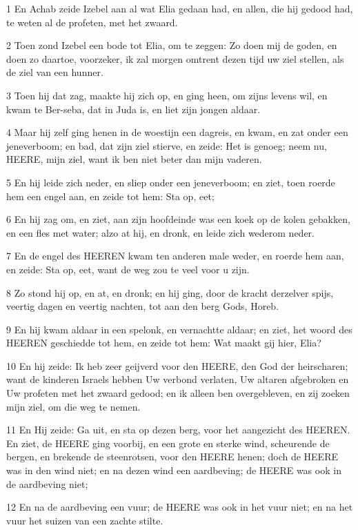 \par 1 En Achab zeide Izebel aan al wat Elia gedaan had, en allen, die hij gedood had, te weten al de profeten, met het zwaard.
\par 2 Toen zond Izebel een bode tot Elia, om te zeggen: Zo doen mij de goden, en doen zo daartoe, voorzeker, ik zal morgen omtrent dezen tijd uw ziel stellen, als de ziel van een hunner.
\par 3 Toen hij dat zag, maakte hij zich op, en ging heen, om zijns levens wil, en kwam te Ber-seba, dat in Juda is, en liet zijn jongen aldaar.
\par 4 Maar hij zelf ging henen in de woestijn een dagreis, en kwam, en zat onder een jeneverboom; en bad, dat zijn ziel stierve, en zeide: Het is genoeg; neem nu, HEERE, mijn ziel, want ik ben niet beter dan mijn vaderen.
\par 5 En hij leide zich neder, en sliep onder een jeneverboom; en ziet, toen roerde hem een engel aan, en zeide tot hem: Sta op, eet;
\par 6 En hij zag om, en ziet, aan zijn hoofdeinde was een koek op de kolen gebakken, en een fles met water; alzo at hij, en dronk, en leide zich wederom neder.
\par 7 En de engel des HEEREN kwam ten anderen male weder, en roerde hem aan, en zeide: Sta op, eet, want de weg zou te veel voor u zijn.
\par 8 Zo stond hij op, en at, en dronk; en hij ging, door de kracht derzelver spijs, veertig dagen en veertig nachten, tot aan den berg Gods, Horeb.
\par 9 En hij kwam aldaar in een spelonk, en vernachtte aldaar; en ziet, het woord des HEEREN geschiedde tot hem, en zeide tot hem: Wat maakt gij hier, Elia?
\par 10 En hij zeide: Ik heb zeer geijverd voor den HEERE, den God der heirscharen; want de kinderen Israels hebben Uw verbond verlaten, Uw altaren afgebroken en Uw profeten met het zwaard gedood; en ik alleen ben overgebleven, en zij zoeken mijn ziel, om die weg te nemen.
\par 11 En Hij zeide: Ga uit, en sta op dezen berg, voor het aangezicht des HEEREN. En ziet, de HEERE ging voorbij, en een grote en sterke wind, scheurende de bergen, en brekende de steenrotsen, voor den HEERE henen; doch de HEERE was in den wind niet; en na dezen wind een aardbeving; de HEERE was ook in de aardbeving niet;
\par 12 En na de aardbeving een vuur; de HEERE was ook in het vuur niet; en na het vuur het suizen van een zachte stilte.
